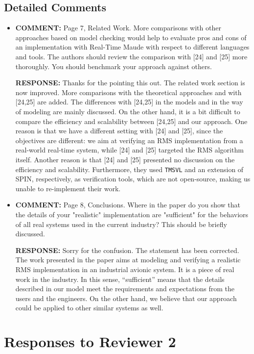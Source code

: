 \documentclass[10pt,journal]{IEEEtran}
\newcommand{\ANSWER}{{\bf RESPONSE: }}
\newcommand{\COMMENT}{{\bf COMMENT: }}
\begin{document}
\subsection{Detailed Comments}
\begin{itemize}
\item
\COMMENT Page 7, Related Work. More comparisons with other approaches
based on model checking would help to evaluate pros and cons of an
implementation with Real-Time Maude with respect to different
languages and tools. The authors should review the comparison with
[24] and [25] more thoroughly. You should benchmark your approach
against others.

\ANSWER Thanks for the pointing this out. The related work section is
now improved. More comparisons with the theoretical approaches and
with [24,25] are added. The differences with [24,25] in the models and
in the way of modeling are mainly discussed. On the other hand, it is
a bit difficult to compare the efficiency and scalability between
[24,25] and our approach. One reason is that we have a different
setting with [24] and [25], since the objectives are different: we aim
at verifying an RMS implementation from a real-world real-time system,
while [24] and [25] targeted the RMS algorithm itself. Another reason
is that [24] and [25] presented no discussion on the efficiency and
scalability. Furthermore, they used \verb|TMSVL| and an extension of
SPIN, respectively, as verification tools, which are not open-source,
making us unable to re-implement their work.

\item
\COMMENT Page 8, Conclusions. Where in the paper do you show that the
details of your "realistic" implementation are "sufficient" for the
behaviors of all real systems used in the current industry? This
should be briefly discussed.

\ANSWER Sorry for the confusion. The statement has been corrected. The
work presented in the paper aims at modeling and verifying a realistic
RMS implementation in an industrial avionic system. It is a piece of
real work in the industry. In this sense, ``sufficient'' means that
the details described in our model meet the requirements and
expectations from the users and the engineers. On the other hand, we
believe that our approach could be applied to other similar systems as
well.

\end{itemize}

\section{Responses to Reviewer 2}
\end{document}

